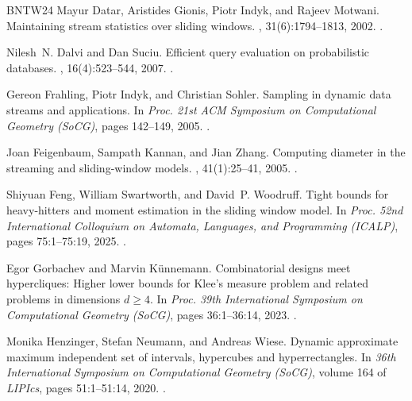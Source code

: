 \documentclass[11pt]{article}
\begin{document}
\begin{thebibliography}{BNTW24}
Mayur Datar, Aristides Gionis, Piotr Indyk, and Rajeev Motwani.
\newblock Maintaining stream statistics over sliding windows.
, 31(6):1794--1813, 2002.
\newblock \href {https://doi.org/10.1137/S0097539701398363}
  {}.

Nilesh~N. Dalvi and Dan Suciu.
\newblock Efficient query evaluation on probabilistic databases.
, 16(4):523--544, 2007.
\newblock \href {https://doi.org/10.1007/S00778-006-0004-3}
  {}.

Gereon Frahling, Piotr Indyk, and Christian Sohler.
\newblock Sampling in dynamic data streams and applications.
\newblock In {\em Proc. 21st {ACM} Symposium on Computational Geometry (SoCG)},
  pages 142--149, 2005.
\newblock \href {https://doi.org/10.1145/1064092.1064116}
  {}.

Joan Feigenbaum, Sampath Kannan, and Jian Zhang.
\newblock Computing diameter in the streaming and sliding-window models.
, 41(1):25--41, 2005.
\newblock \href {https://doi.org/10.1007/S00453-004-1105-2}
  {}.

Shiyuan Feng, William Swartworth, and David~P. Woodruff.
\newblock Tight bounds for heavy-hitters and moment estimation in the sliding
  window model.
\newblock In {\em Proc. 52nd International Colloquium on Automata, Languages,
  and Programming (ICALP)}, pages 75:1--75:19, 2025.
\newblock \href {https://doi.org/10.4230/LIPIcs.ICALP.2025.75}
  {}.

Egor Gorbachev and Marvin K{\"{u}}nnemann.
\newblock Combinatorial designs meet hypercliques: {H}igher lower bounds for
  {K}lee's measure problem and related problems in dimensions $d\ge 4$.
\newblock In {\em Proc. 39th International Symposium on Computational Geometry
  (SoCG)}, pages 36:1--36:14, 2023.
\newblock \href {https://doi.org/10.4230/LIPICS.SOCG.2023.36}
  {}.

Monika Henzinger, Stefan Neumann, and Andreas Wiese.
\newblock Dynamic approximate maximum independent set of intervals, hypercubes
  and hyperrectangles.
\newblock In {\em 36th International Symposium on Computational Geometry
  (SoCG)}, volume 164 of {\em LIPIcs}, pages 51:1--51:14, 2020.
\newblock \href {https://doi.org/10.4230/LIPICS.SOCG.2020.51}
  {}.


\end{thebibliography}
\end{document}
